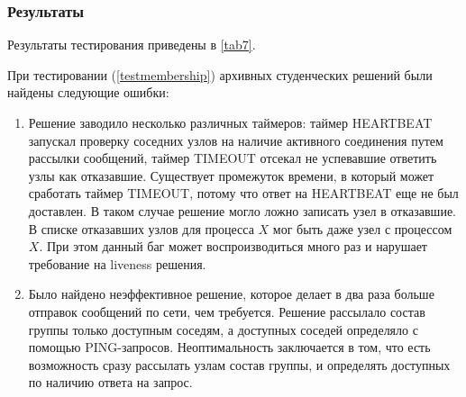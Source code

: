 \documentclass[a4paper,12pt]{extarticle}
\newcommand{\goal}[0]{\texttt{Goal}}
\newcommand{\prune}[0]{\texttt{Prune}}
\newcommand{\invariant}[0]{\texttt{Invariant}}
\newcommand{\collect}[0]{\texttt{Collect}}
\begin{document}










\subsubsection{Результаты}

Результаты тестирования приведены в \cref{tab7}.

При тестировании (\cref{testmembership}) архивных студенческих решений были найдены следующие ошибки:
\begin{enumerate}
    \item Решение заводило несколько различных таймеров: таймер HEARTBEAT запускал проверку соседних узлов на наличие активного соединения путем рассылки сообщений, таймер TIMEOUT отсекал не успевавшие ответить узлы как отказавшие.
Существует промежуток времени, в который может сработать таймер TIMEOUT, потому что ответ на HEARTBEAT еще не был доставлен.
В таком случае решение могло ложно записать узел в отказавшие.
В списке отказавших узлов для процесса $X$ мог быть даже узел с процессом $X$.
При этом данный баг может воспроизводиться много раз и нарушает требование на liveness решения.
    \item Было найдено неэффективное решение, которое делает в два раза больше отправок сообщений по сети, чем требуется.
Решение рассылало состав группы только доступным соседям, а доступных соседей определяло с помощью PING-запросов.
Неоптимальность заключается в том, что есть возможность сразу рассылать узлам состав группы, и определять доступных по наличию ответа на запрос.
\end{enumerate} 
\end{document}
